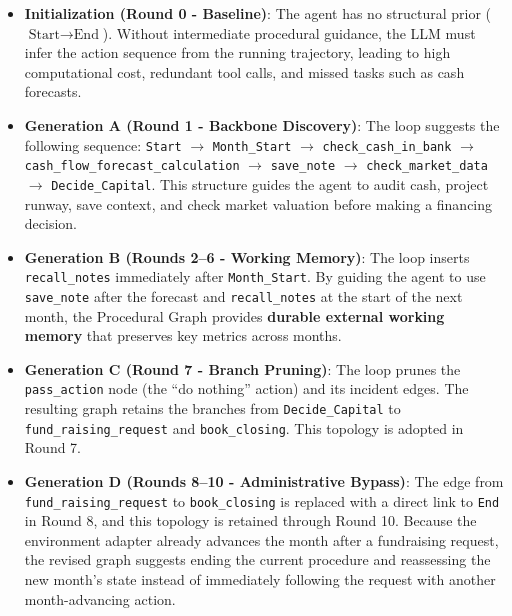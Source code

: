\begin{itemize}[leftmargin=*]
    \item \textbf{Initialization (Round 0 - Baseline)}: The agent has no structural prior ($\text{Start} \rightarrow \text{End}$). Without intermediate procedural guidance, the LLM must infer the action sequence from the running trajectory, leading to high computational cost, redundant tool calls, and missed tasks such as cash forecasts.
    \newpage
    \item \begin{samepage}\textbf{Generation A (Round 1 - Backbone Discovery)}: The loop suggests the following sequence: \texttt{Start} $\rightarrow$ \texttt{Month\_Start} $\rightarrow$ \texttt{check\_cash\_in\_bank} $\rightarrow$ \texttt{cash\_flow\_forecast\_calculation} $\rightarrow$ \texttt{save\_note} $\rightarrow$ \texttt{check\_market\_data} $\rightarrow$ \texttt{Decide\_Capital}. This structure guides the agent to audit cash, project runway, save context, and check market valuation before making a financing decision.\par\end{samepage}
    \item \textbf{Generation B (Rounds 2--6 - Working Memory)}: The loop inserts \texttt{recall\_notes} immediately after \texttt{Month\_Start}. By guiding the agent to use \texttt{save\_note} after the forecast and \texttt{recall\_notes} at the start of the next month, the Procedural Graph provides \textbf{durable external working memory} that preserves key metrics across months.
    \item \textbf{Generation C (Round 7 - Branch Pruning)}: The loop prunes the \texttt{pass\_action} node (the ``do nothing'' action) and its incident edges. The resulting graph retains the branches from \texttt{Decide\_Capital} to \texttt{fund\_raising\_request} and \texttt{book\_closing}. This topology is adopted in Round 7.
    \item \textbf{Generation D (Rounds 8--10 - Administrative Bypass)}: The edge from \texttt{fund\_raising\_request} to \texttt{book\_closing} is replaced with a direct link to \texttt{End} in Round 8, and this topology is retained through Round 10. Because the environment adapter already advances the month after a fundraising request, the revised graph suggests ending the current procedure and reassessing the new month's state instead of immediately following the request with another month-advancing action.
\end{itemize}

